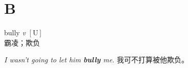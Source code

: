 \section{B}

\item[] {
    \lettrine{bully}{}  
    \textit{v} 
    $\mathrm{[U]}$ 
    \\
    霸凌；欺负

    \textit{I wasn't going to let him \textbf{bully} me. }
    我可不打算被他欺负。

} 
